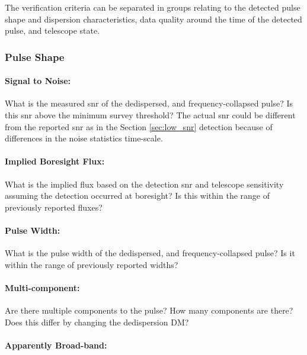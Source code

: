 \documentclass[a4paper,fleqn,usenatbib]{mnras}
\begin{document}
The verification criteria can be separated in groups relating to the detected
pulse shape and dispersion characteristics, data quality around the time of the
detected pulse, and telescope state.

\subsubsection{Pulse Shape}


\paragraph{Signal to Noise:}

What is the measured \gls{snr} of the dedispersed, and frequency-collapsed pulse?
Is this \gls{snr} above the minimum survey threshold? The actual \gls{snr} could
be different from the reported \gls{snr} as in the Section \ref{sec:low_snr}
detection because of differences in the noise statistics time-scale.

\paragraph{Implied Boresight Flux:}

What is the implied flux based on the detection \gls{snr} and telescope
sensitivity assuming the detection occurred at boresight? Is this within the
range of previously reported fluxes?

\paragraph{Pulse Width:}

What is the pulse width of the dedispersed, and frequency-collapsed pulse? Is it
within the range of previously reported widths?

\paragraph{Multi-component:}

Are there multiple components to the pulse? How many components are there? Does
this differ by changing the dedispersion DM?

\paragraph{Apparently Broad-band:}
\end{document}
